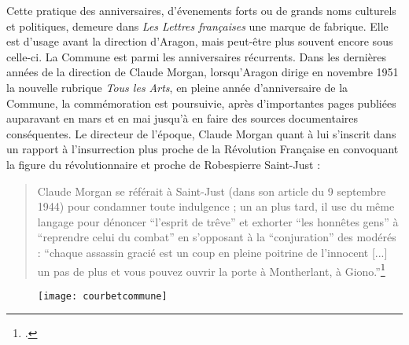 Cette pratique des anniversaires, d'évenements forts ou de grands noms culturels et politiques, demeure dans \emph{Les Lettres françaises} une marque de fabrique. Elle est d'usage avant la direction d'Aragon, mais peut-être plus souvent encore sous celle-ci. La Commune est parmi les anniversaires récurrents. Dans les dernières années de la direction de Claude Morgan, lorsqu'Aragon dirige en novembre 1951 la nouvelle rubrique \emph{Tous les Arts}, en pleine année d'anniversaire de la Commune, la commémoration est poursuivie, après d'importantes pages publiées auparavant en mars et en mai jusqu'à en faire des sources documentaires conséquentes. Le directeur de l'époque, Claude Morgan quant à lui s'inscrit dans un rapport à l'insurrection plus proche de la Révolution Française en convoquant la figure du révolutionnaire et proche de Robespierre Saint-Just :

\begin{quote}
Claude Morgan se référait à Saint-Just (dans son article du 9 septembre 1944) pour condamner toute indulgence ; un an plus tard, il use du même langage pour dénoncer \enquote{l'esprit de trêve} et exhorter \enquote{les honnêtes gens} à \enquote{reprendre celui du combat} en s'opposant à la \enquote{conjuration} des modérés : \enquote{chaque assassin gracié est un coup en pleine poitrine de l'innocent [...] un pas de plus et vous pouvez ouvrir la porte à Montherlant, à Giono.}\footcite[p538]{these}	
\end{quote}

\begin{figure}[H]
   \centering
   \texttt{[image: courbetcommune]}
	\caption{\cite{courbetcommunard}}\label{courbetcommune}
\end{figure}


